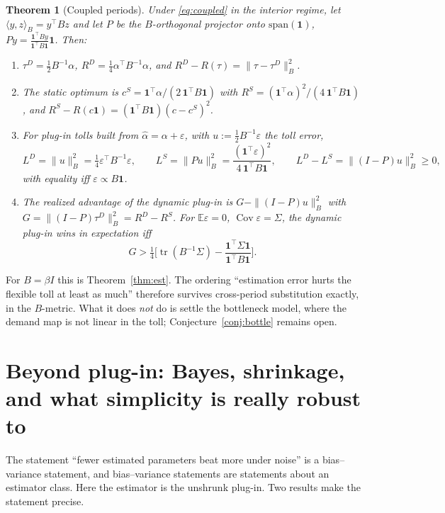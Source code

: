 \documentclass[11pt]{article}
\newtheorem{theorem}{Theorem}[section]
\theoremstyle{definition}
\theoremstyle{remark}
\newcommand{\E}{\mathbb{E}}
\newcommand{\Cov}{\operatorname{Cov}}
\newcommand{\one}{\mathbf{1}}
\newcommand{\tr}{\operatorname{tr}}
\begin{document}
\begin{theorem}[Coupled periods]\label{thm:coupled}
Under \eqref{eq:coupled} in the interior regime, let $\langle y,z\rangle_B=y^\top Bz$ and let $P$ be the $B$-orthogonal projector onto $\mathrm{span}(\one)$, $Py=\frac{\one^\top By}{\one^\top B\one}\one$. Then:
\begin{enumerate}[label=(\alph*)]
\item $\tau^D=\tfrac12B^{-1}\alpha$, $R^D=\tfrac14\alpha^\top B^{-1}\alpha$, and $R^D-R(\tau)=\|\tau-\tau^D\|_B^2$.
\item The static optimum is $c^S=\one^\top\alpha/(2\,\one^\top B\one)$ with $R^S=(\one^\top\alpha)^2/(4\,\one^\top B\one)$, and $R^S-R(c\one)=(\one^\top B\one)(c-c^S)^2$.
\item For plug-in tolls built from $\hat\alpha=\alpha+\varepsilon$, with $u:=\tfrac12B^{-1}\varepsilon$ the toll error,
\[L^D=\|u\|_B^2=\tfrac14\varepsilon^\top B^{-1}\varepsilon,\qquad L^S=\|Pu\|_B^2=\frac{(\one^\top\varepsilon)^2}{4\,\one^\top B\one},\qquad L^D-L^S=\|(I-P)u\|_B^2\ge0,\]
with equality iff $\varepsilon\propto B\one$.
\item The realized advantage of the dynamic plug-in is $G-\|(I-P)u\|_B^2$ with $G=\|(I-P)\tau^D\|_B^2=R^D-R^S$. For $\E\varepsilon=0$, $\Cov\varepsilon=\Sigma$, the dynamic plug-in wins in expectation iff
\[G>\tfrac14\Big[\tr(B^{-1}\Sigma)-\frac{\one^\top\Sigma\one}{\one^\top B\one}\Big].\]
\end{enumerate}
\end{theorem}
For $B=\beta I$ this is Theorem~\ref{thm:est}. The ordering ``estimation error hurts the flexible toll at least as much'' therefore survives cross-period substitution exactly, in the $B$-metric. What it does \emph{not} do is settle the bottleneck model, where the demand map is not linear in the toll; Conjecture~\ref{conj:bottle} remains open.

\section{Beyond plug-in: Bayes, shrinkage, and what simplicity is really robust to}\label{sec:bayes}
The statement ``fewer estimated parameters beat more under noise'' is a bias--variance statement, and bias--variance statements are statements about an estimator class. Here the estimator is the unshrunk plug-in. Two results make the statement precise.
\end{document}

